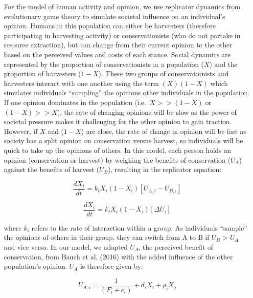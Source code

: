\documentclass[
  12pt,
]{article}
\begin{document}
For the model of human activity and opinion, we use replicator dynamics from evolutionary game theory to simulate societal influence on an individual's opinion. Humans in this population can either be harvesters (therefore participating in harvesting activity) or conservationists (who do not partake in resource extraction), but can change from their current opinion to the other based on the perceived values and costs of each stance. Social dynamics are represented by the proportion of conservationists in a population (\(X\)) and the proportion of harvesters (\(1-X\)). These two groups of conservationists and harvesters interact with one another using the term \((X)(1-X)\) which simulates individuals ``sampling'' the opinions other individuals in the population. If one opinion dominates in the population (i.e.~\(X >> (1-X)\) or \((1-X) >> X\)), the rate of changing opinions will be slow as the power of societal pressure makes it challenging for the other opinion to gain traction. However, if \(X\) and (\(1-X\)) are close, the rate of change in opinion will be fast as society has a split opinion on conservation versus harvest, so individuals will be quick to take up the opinions of others. In this model, each person holds an opinion (conservation or harvest) by weighing the benefits of conservation (\(U_A\)) against the benefits of harvest (\(U_B\)), resulting in the replicator equation:

\begin{equation} 
\frac{dX_i}{dt} = k_iX_i(1-X_i)[U_{A,i} - U_{B,i}]
  \label{eq:rep1}
\end{equation}

\begin{equation} 
\frac{dX_i}{dt} = k_iX_i(1-X_i)[\Delta U_i]
  \label{eq:rep2}
\end{equation}

where \(k_i\) refers to the rate of interaction within a group. As individuals ``sample'' the opinions of others in their group, they can switch from A to B if \(U_B\) \textgreater{} \(U_A\) and vice versa. In our model, we adapted \(U_A\), the perceived benefit of conservation, from Bauch et al. (2016) with the added influence of the other population's opinion. \(U_A\) is therefore given by:

\begin{equation} 
U_{A,i} = \frac{1}{(F_i + c_i)} + d_iX_i + \rho_i X_j
  \label{eq:pros1}
\end{equation}
\end{document}
